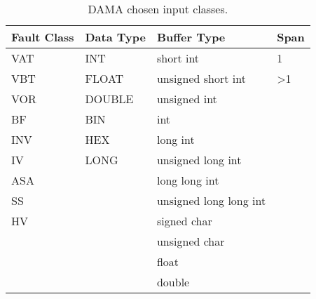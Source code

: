 
\begin{table}[h]

  \scriptsize
  \centering
  \caption{DAMA chosen input classes.}
  \label{table:classes_DAMA}

\begin{tabular}{@{}llll@{}}
\toprule
\textbf{Fault   Class} & \textbf{Data Type} & \textbf{Buffer Type}   & \textbf{Span}   \\ \midrule
VAT                    & INT                & short int              & 1               \\
VBT                    & FLOAT              & unsigned short int     & \textgreater{}1 \\
VOR                    & DOUBLE             & unsigned int           &                 \\
BF                     & BIN                & int                    &                 \\
INV                    & HEX                & long int               &                 \\
IV                     & LONG               & unsigned long int      &                 \\
ASA                    &                    & long long int          &                 \\
SS                     &                    & unsigned long long int &                 \\
HV                     &                    & signed char            &                 \\
                       &                    & unsigned char          &                 \\
                       &                    & float                  &                 \\
                       &                    & double                 &                 \\ \bottomrule
\end{tabular}
\end{table}
